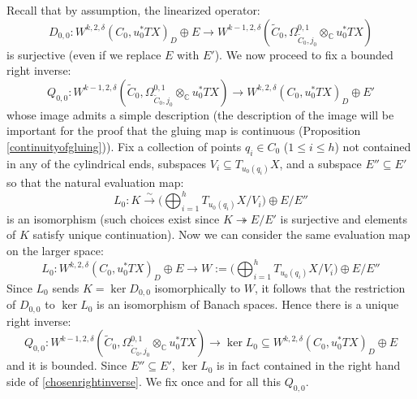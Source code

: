 \documentclass[12pt]{article}
\theoremstyle{definition}
\theoremstyle{remark}
\numberwithin{equation}{subsection}
\newcommand{\CC}{\mathbb C}
\begin{document}
Recall that by assumption, the linearized operator:
\begin{equation}
D_{0,0}:W^{k,2,\delta}(C_0,u_0^\ast TX)_D\oplus E\to W^{k-1,2,\delta}(\tilde C_0,\Omega^{0,1}_{\tilde C_0,j_0}\otimes_\CC u_0^\ast TX)
\end{equation}
is surjective (even if we replace $E$ with $E'$).  We now proceed to fix a bounded right inverse:
\begin{equation}\label{chosenrightinverse}
Q_{0,0}:W^{k-1,2,\delta}(\tilde C_0,\Omega^{0,1}_{\tilde C_0,j_0}\otimes_\CC u_0^\ast TX)\to W^{k,2,\delta}(C_0,u_0^\ast TX)_D\oplus E'
\end{equation}
whose image admits a simple description (the description of the image will be important for the proof that the gluing map is continuous (Proposition \ref{continuityofgluing})).  Fix a collection of points $q_i\in C_0$ ($1\leq i\leq h$) not contained in any of the cylindrical ends, subspaces $V_i\subseteq T_{u_0(q_i)}X$, and a subspace $E''\subseteq E'$ so that the natural evaluation map:
\begin{equation}
L_0:K\xrightarrow\sim\biggl(\bigoplus_{i=1}^hT_{u_0(q_i)}X/V_i\biggr)\oplus E/E''
\end{equation}
is an isomorphism (such choices exist since $K\twoheadrightarrow E/E'$ is surjective and elements of $K$ satisfy unique continuation).  Now we can consider the same evaluation map on the larger space:
\begin{equation}\label{lineartofixinverse}
L_0:W^{k,2,\delta}(C_0,u_0^\ast TX)_D\oplus E\to W:=\biggl(\bigoplus_{i=1}^hT_{u_0(q_i)}X/V_i\biggr)\oplus E/E''
\end{equation}
Since $L_0$ sends $K=\ker D_{0,0}$ isomorphically to $W$, it follows that the restriction of $D_{0,0}$ to $\ker L_0$ is an isomorphism of Banach spaces.  Hence there is a unique right inverse:
\begin{equation*}%
Q_{0,0}:W^{k-1,2,\delta}(\tilde C_0,\Omega^{0,1}_{\tilde C_0,j_0}\otimes_\CC u_0^\ast TX)\to\ker L_0\subseteq W^{k,2,\delta}(C_0,u_0^\ast TX)_D\oplus E
\end{equation*}
and it is bounded.  Since $E''\subseteq E'$, $\ker L_0$ is in fact contained in the right hand side of \eqref{chosenrightinverse}.  We fix once and for all this $Q_{0,0}$.
\end{document}
